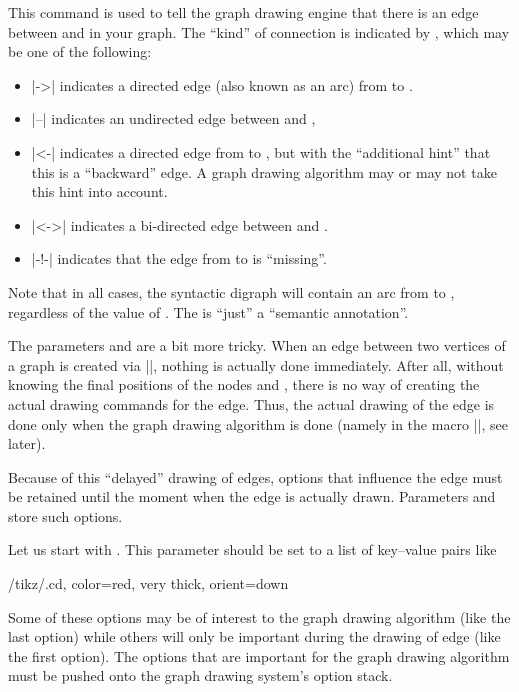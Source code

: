 \begin{command}{\pgfgdedge{}}
    This command is used to tell the graph drawing engine that there is an edge
    between  and  in your graph. The
    ``kind'' of connection is indicated by , which may be one
    of the following:
    \begin{itemize}
        \item |->| indicates a directed edge (also known as an arc) from
             to .
        \item |--| indicates an undirected edge between  and
            ,
        \item |<-| indicates a directed edge from  to
            , but with the ``additional hint'' that this is a
            ``backward'' edge. A graph drawing algorithm may  or may not take
            this hint into account.
        \item |<->| indicates a bi-directed edge between  and
            .
        \item |-!-| indicates that the edge from  to
             is ``missing''.
    \end{itemize}
    Note that in all cases, the syntactic digraph will contain an arc from
     to , regardless of the value of
    . The  is ``just'' a ``semantic
    annotation''.

    The parameters  and  are a bit more
    tricky. When an edge between two vertices of a graph is created via
    |\pgfgdedge|, nothing is actually done immediately. After all, without
    knowing the final positions of the nodes  and , there is no way of creating the actual drawing commands for the
    edge. Thus, the actual drawing of the edge is done only when the graph
    drawing algorithm is done (namely in the macro |\pgfgdedgecallback|, see
    later).

    Because of this ``delayed'' drawing of edges, options that influence the
    edge must be retained until the moment when the edge is actually drawn.
    Parameters  and  store such options.

    Let us start with . This parameter should be set to a
    list of key--value pairs like
\begin{codeexample}
/tikz/.cd, color=red, very thick, orient=down
\end{codeexample}
    Some of these options may be of interest to the graph drawing algorithm
    (like the last option) while others will only be important during the
    drawing of edge (like the first option). The options that are important for
    the graph drawing algorithm must be pushed onto the graph drawing system's
    option stack.


\end{command}
